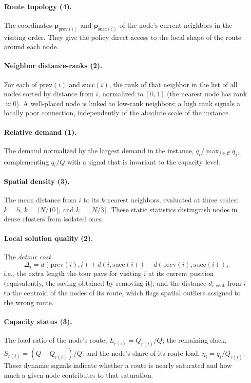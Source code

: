 \documentclass[letterpaper]{article} %
\begin{document}
\paragraph{Route topology (4).}
The coordinates $\mathbf{p}_{\mathrm{prev}(i)}$ and $\mathbf{p}_{\mathrm{succ}(i)}$ of the node's current neighbors in the visiting order. They give the policy direct access to the local shape of the route around each node.

\paragraph{Neighbor distance-ranks (2).}
For each of $\mathrm{prev}(i)$ and $\mathrm{succ}(i)$, the rank of that neighbor in the list of all nodes sorted by distance from $i$, normalized to $[0,1]$ (the nearest node has rank $\approx 0$). A well-placed node is linked to low-rank neighbors; a high rank signals a locally poor connection, independently of the absolute scale of the instance.

\paragraph{Relative demand (1).}
The demand normalized by the largest demand in the instance, $q_i / \max_{j \in \mathcal{C}} q_j$, complementing $q_i / Q$ with a signal that is invariant to the capacity level.

\paragraph{Spatial density (3).}
The mean distance from $i$ to its $k$ nearest neighbors, evaluated at three scales: $k = 5$, $k = \lceil N/10 \rceil$, and $k = \lceil N/3 \rceil$. These static statistics distinguish nodes in dense clusters from isolated ones.

\paragraph{Local solution quality (2).}
The \emph{detour cost}
$$
\Delta_i = d(\mathrm{prev}(i), i) + d(i, \mathrm{succ}(i)) - d(\mathrm{prev}(i), \mathrm{succ}(i)),
$$
i.e., the extra length the tour pays for visiting $i$ at its current position (equivalently, the saving obtained by removing it); and the distance $d_{i,\mathrm{cent}}$ from $i$ to the centroid of the nodes of its route, which flags spatial outliers assigned to the wrong route.

\paragraph{Capacity status (3).}
The load ratio of the node's route, $L_{r(i)} = Q_{r(i)} / Q$; the remaining slack, $S_{r(i)} = (Q - Q_{r(i)}) / Q$; and the node's share of its route load, $\eta_i = q_i / Q_{r(i)}$. These dynamic signals indicate whether a route is nearly saturated and how much a given node contributes to that saturation.
\end{document}

